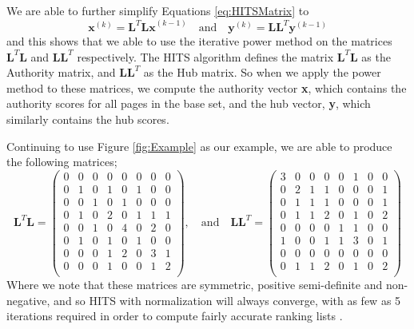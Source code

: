 \documentclass[11pt]{report}
\begin{document}
We are able to further simplify Equations \eqref{eq:HITSMatrix} to \begin{equation} \label{eq:HITSSimplify}
\textbf{x}^{(k)} = \textbf{L}^T\textbf{Lx}^{(k-1)}\quad\mathrm{and}\quad \textbf{y}^{(k)}=\textbf{LL}^T\textbf{y}^{(k-1)}
\end{equation} and this shows that we able to use the iterative power method on the matrices $\textbf{L}^T\textbf{L}$ and $\textbf{LL}^T$ respectively. The HITS algorithm defines the matrix $\textbf{L}^T\textbf{L}$ as the Authority matrix, and $\textbf{LL}^T$ as the Hub matrix. So when we apply the power method to these matrices, we compute the authority vector \textbf{x}, which contains the authority scores for all pages in the base set, and the hub vector, \textbf{y}, which similarly contains the hub scores.

Continuing to use Figure \ref{fig:Example} as our example, we are able to produce the following matrices;
\begin{equation*}
\textbf{L}^T\textbf{L}=\left(
\begin{array}{cccccccc}
0 & 0 & 0 & 0 & 0 & 0 & 0 & 0 \\
0 & 1 & 0 & 1 & 0 & 1 & 0 & 0 \\
0 & 0 & 1 & 0 & 1 & 0 & 0 & 0 \\
0 & 1 & 0 & 2 & 0 & 1 & 1 & 1 \\
0 & 0 & 1 & 0 & 4 & 0 & 2 & 0 \\
0 & 1 & 0 & 1 & 0 & 1 & 0 & 0 \\
0 & 0 & 0 & 1 & 2 & 0 & 3 & 1 \\
0 & 0 & 0 & 1 & 0 & 0 & 1 & 2 \\
\end{array}
\right)
\mathrm{,}\quad\mathrm{and}\quad
\textbf{LL}^T=\left(
\begin{array}{cccccccc}
3 & 0 & 0 & 0 & 0 & 1 & 0 & 0 \\
0 & 2 & 1 & 1 & 0 & 0 & 0 & 1 \\
0 & 1 & 1 & 1 & 0 & 0 & 0 & 1 \\
0 & 1 & 1 & 2 & 0 & 1 & 0 & 2 \\
0 & 0 & 0 & 0 & 1 & 1 & 0 & 0 \\
1 & 0 & 0 & 1 & 1 & 3 & 0 & 1 \\
0 & 0 & 0 & 0 & 0 & 0 & 0 & 0 \\
0 & 1 & 1 & 2 & 0 & 1 & 0 & 2 \\
\end{array}
\right)
\end{equation*} Where we note that these matrices are symmetric, positive semi-definite and non-negative, and so HITS with normalization will always converge, with as few as 5 iterations required in order to compute fairly accurate ranking lists \cite{manning}. 
\end{document}
